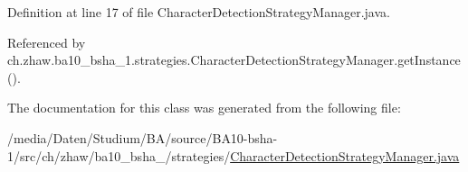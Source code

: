 Definition at line 17 of file CharacterDetectionStrategyManager.java.

Referenced by ch.zhaw.ba10\_\-bsha\_\-1.strategies.CharacterDetectionStrategyManager.getInstance().

The documentation for this class was generated from the following file:\begin{DoxyCompactItemize}
\item 
/media/Daten/Studium/BA/source/BA10-\/bsha-\/1/src/ch/zhaw/ba10\_\-bsha\_/strategies/\hyperlink{CharacterDetectionStrategyManager_8java}{CharacterDetectionStrategyManager.java}\end{DoxyCompactItemize}
